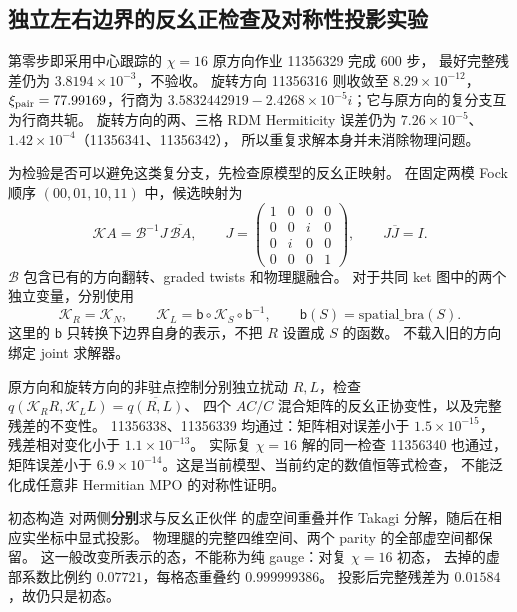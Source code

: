\subsection{独立左右边界的反幺正检查及对称性投影实验}
第零步即采用中心跟踪的 $\chi=16$ 原方向作业 11356329 完成 600 步，
最好完整残差仍为 $3.8194\times10^{-3}$，不验收。
旋转方向 11356316 则收敛至 $8.29\times10^{-12}$，
$\xi_{\rm pair}=77.99169$，行商为
$3.5832442919-2.4268\times10^{-5}i$；它与原方向的复分支互为行商共轭。
旋转方向的两、三格 RDM Hermiticity 误差仍为
$7.26\times10^{-5}$、$1.42\times10^{-4}$（11356341、11356342），
所以重复求解本身并未消除物理问题。

为检验是否可以避免这类复分支，先检查原模型的反幺正映射。
在固定两模 Fock 顺序 $(00,01,10,11)$ 中，候选映射为
\begin{equation}
 \mathcal K A=\mathcal B^{-1}J\,\overline{\mathcal B A},\qquad
 J=\begin{pmatrix}1&0&0&0\\0&0&i&0\\0&i&0&0\\0&0&0&1\end{pmatrix},
 \qquad J\overline J=I .
\end{equation}
$\mathcal B$ 包含已有的方向翻转、graded twists 和物理腿融合。
对于共同 ket 图中的两个独立变量，分别使用
\begin{equation}
 \mathcal K_R=\mathcal K_N,\qquad
 \mathcal K_L=\mathsf b\circ\mathcal K_S\circ\mathsf b^{-1},
 \qquad \mathsf b(S)=\mathrm{spatial\_bra}(S).
\end{equation}
这里的 $\mathsf b$ 只转换下边界自身的表示，不把 $R$ 设置成 $S$ 的函数。
 不载入旧的方向绑定 joint 求解器。

原方向和旋转方向的非驻点控制分别独立扰动 $R,L$，检查
$q(\mathcal K_R R,\mathcal K_L L)=\overline{q(R,L)}$、
四个 $AC/C$ 混合矩阵的反幺正协变性，以及完整残差的不变性。
11356338、11356339 均通过：矩阵相对误差小于 $1.5\times10^{-15}$，
残差相对变化小于 $1.1\times10^{-13}$。
实际复 $\chi=16$ 解的同一检查 11356340 也通过，矩阵误差小于
$6.9\times10^{-14}$。这是当前模型、当前约定的数值恒等式检查，
不能泛化成任意非 Hermitian MPO 的对称性证明。

初态构造  对两侧\textbf{分别}求与反幺正伙伴
的虚空间重叠并作 Takagi 分解，随后在相应实坐标中显式投影。
物理腿的完整四维空间、两个 parity 的全部虚空间都保留。
这一般改变所表示的态，不能称为纯 gauge：对复 $\chi=16$ 初态，
去掉的虚部系数比例约 $0.07721$，每格态重叠约 $0.999999386$。
投影后完整残差为 $0.01584$，故仍只是初态。

